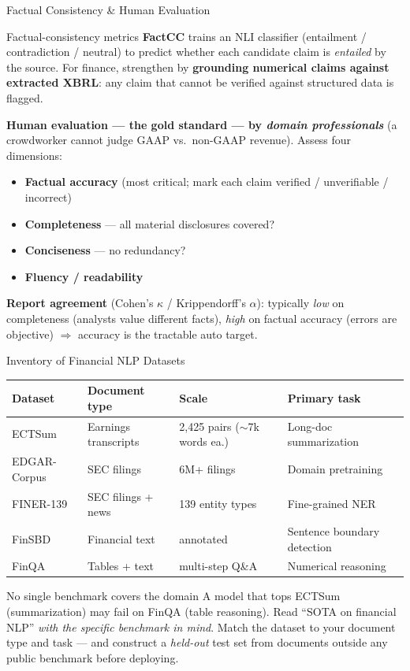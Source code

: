 \documentclass[9pt,t]{beamer}
\begin{document}
\begin{frame}{Factual Consistency \& Human Evaluation}
\begin{block}{Factual-consistency metrics}
\textbf{FactCC} trains an NLI classifier (entailment / contradiction / neutral) to
predict whether each candidate claim is \emph{entailed} by the source. For finance,
strengthen by \textbf{grounding numerical claims against extracted XBRL}: any claim
that cannot be verified against structured data is flagged.
\end{block}

\medskip
\textbf{Human evaluation --- the gold standard --- by \emph{domain professionals}}
(a crowdworker cannot judge GAAP vs.\ non-GAAP revenue). Assess four dimensions:
\begin{itemize}
  \item \textbf{Factual accuracy} (most critical; mark each claim verified / unverifiable / incorrect)
  \item \textbf{Completeness} --- all material disclosures covered?
  \item \textbf{Conciseness} --- no redundancy?
  \item \textbf{Fluency / readability}
\end{itemize}

\medskip
\textbf{Report agreement} (Cohen's $\kappa$ / Krippendorff's $\alpha$): typically
\emph{low} on completeness (analysts value different facts), \emph{high} on factual
accuracy (errors are objective) $\Rightarrow$ accuracy is the tractable auto target.
\end{frame}

\begin{frame}{Inventory of Financial NLP Datasets}
\small
\begin{tabular}{llll}
\toprule
\textbf{Dataset} & \textbf{Document type} & \textbf{Scale} & \textbf{Primary task} \\
\midrule
ECTSum       & Earnings transcripts & 2{,}425 pairs ($\sim$7k words ea.) & Long-doc summarization \\
EDGAR-Corpus & SEC filings          & 6M+ filings        & Domain pretraining \\
FINER-139    & SEC filings + news   & 139 entity types   & Fine-grained NER \\
FinSBD       & Financial text       & annotated          & Sentence boundary detection \\
FinQA        & Tables + text        & multi-step Q\&A    & Numerical reasoning \\
\bottomrule
\end{tabular}

\medskip
\begin{alertblock}{No single benchmark covers the domain}
A model that tops ECTSum (summarization) may fail on FinQA (table reasoning).
Read ``SOTA on financial NLP'' \emph{with the specific benchmark in mind}. Match
the dataset to your document type and task --- and construct a \emph{held-out} test
set from documents outside any public benchmark before deploying.
\end{alertblock}
\end{frame}
\end{document}
